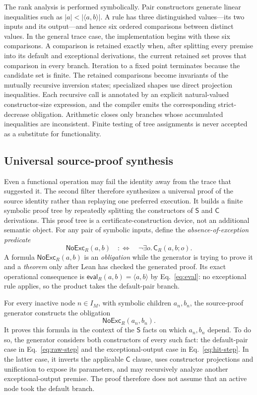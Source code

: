 \documentclass[runningheads]{llncs}
\newcommand{\Code}{\mathsf{C}}
\newcommand{\Step}{\mathsf{S}}
\newcommand{\NoExc}{\mathsf{NoExc}}
\newcommand{\evalop}{\mathsf{eval}}
\newcommand{\pair}[2]{\langle #1,#2\rangle}
\begin{document}
The rank analysis is performed symbolically.  Pair constructors generate
linear inequalities such as $|a|<|\pair{a}{b}|$.  A rule has three distinguished
values---its two inputs and its output---and hence six ordered comparisons
between distinct values.  In the general trace case, the implementation begins
with these six comparisons.  A comparison is retained exactly when, after
splitting every premise into its default and exceptional derivations, the
current retained set proves that comparison in every branch.  Iteration to a
fixed point terminates because the candidate set is finite.  The retained
comparisons become invariants of the mutually recursive inversion states;
specialized shapes use direct projection inequalities.  Each recursive call
is annotated by an explicit natural-valued constructor-size expression, and
the compiler emits the corresponding strict-decrease obligation.  Arithmetic
closes only branches whose accumulated inequalities are inconsistent.  Finite
testing of tree assignments is never accepted as a substitute for
functionality.

\subsection{Universal source-proof synthesis}
\label{sec:tableau}

Even a functional operation may fail the identity away from the trace that
suggested it.  The second filter therefore synthesizes a universal proof of
the source identity rather than replaying one preferred execution.  It builds
a finite symbolic proof tree by repeatedly splitting the constructors of
$\Step$ and $\Code$ derivations.  This proof tree is a certificate-construction
device, not an additional semantic object.  For any pair of symbolic inputs,
define the \emph{absence-of-exception predicate}
\begin{equation}
  \NoExc_R(a,b)\quad:\!\Longleftrightarrow\quad
  \neg\exists o.\,\Code_R(a,b;o).
\end{equation}
A formula $\NoExc_R(a,b)$ is an \emph{obligation} while the generator is
trying to prove it and a \emph{theorem} only after Lean has checked the
generated proof.  Its exact operational consequence is
$\evalop_R(a,b)=\pair{a}{b}$ by Eq.~\eqref{eq:eval}: no exceptional rule
applies, so the product takes the default-pair branch.

For every inactive node $n\in I_M$, with symbolic children $a_n,b_n$, the
source-proof generator constructs the obligation
\[
  \NoExc_R(a_n,b_n).
\]
It proves this formula in the context of the $\Step$ facts on which $a_n,b_n$
depend.  To do so, the generator considers both constructors of every such
fact: the default-pair
case in Eq.~\eqref{eq:raw-step} and the exceptional-output case in
Eq.~\eqref{eq:hit-step}.  In the latter case, it inverts the applicable
$\Code$ clause, uses constructor projections and unification to expose its
parameters, and may recursively analyze another exceptional-output premise.
The proof therefore does not assume that an active node took the default
branch.
\end{document}
